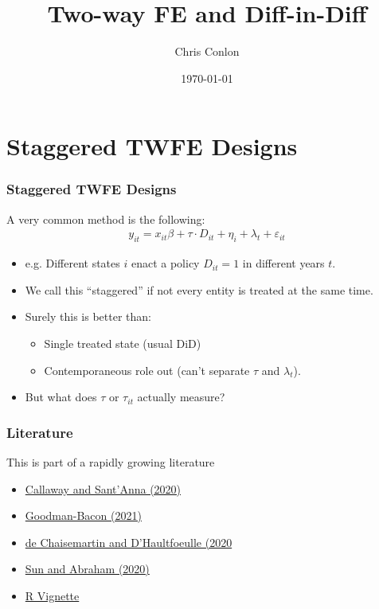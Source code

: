 \documentclass[aspectratio=169,11pt]{beamer}
\title{ Two-way FE and Diff-in-Diff}
\author{Chris Conlon }
\institute{NYU Stern }
\date{\today}
\begin{document}
\maketitle

\section*{Staggered TWFE Designs}

\begin{frame}
\frametitle{Staggered TWFE Designs}
A very common method is the following:
\begin{align*}
y_{it} = x_{it} \beta + \tau\cdot  D_{it} + \eta_i + \lambda_t + \varepsilon_{it}
\end{align*}

\begin{itemize}
\item e.g. Different states $i$ enact a policy $D_{it}=1$ in different years $t$.
\item We call this ``staggered'' if not every entity is treated at the same time.
\item Surely this is better than:
\begin{itemize}
\item Single treated state (usual DiD)
\item Contemporaneous role out (can't separate $\tau$ and $\lambda_t$).
\end{itemize}
\item But what does $\tau$ or $\tau_{it}$ actually measure?
\end{itemize}
\end{frame}


\begin{frame}
\frametitle{Literature}
This is part of a rapidly growing literature
\begin{itemize}
\item \href{https://www.sciencedirect.com/science/article/pii/S0304407620303948}{Callaway and Sant'Anna (2020)}
\item \href{http://goodman-bacon.com/pdfs/ddtiming.pdf}{Goodman-Bacon (2021)}
\item \href{https://www.aeaweb.org/articles?id=10.1257/aer.20181169}{de Chaisemartin and D'Haultfoeulle (2020}
\item \href{https://arxiv.org/abs/1804.05785}{Sun and Abraham (2020)}
\item \href{https://bcallaway11.github.io/did/}{R Vignette}
\end{itemize}
\end{frame}
\end{document}
